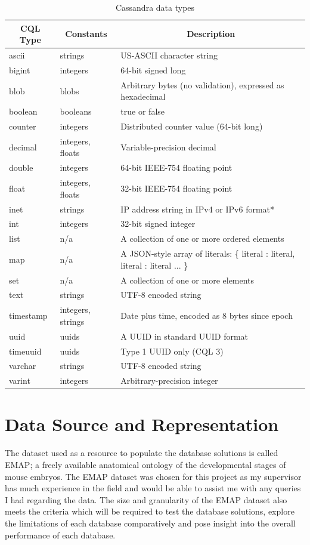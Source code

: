 \begin{table}[H]
\centering
\begin{tabular}{|l|l|l|}
\hline
\multicolumn{1}{|c|}{\textbf{CQL Type}} & \multicolumn{1}{c|}{\textbf{Constants}} & \multicolumn{1}{c|}{\textbf{Description}} \\ \hline
ascii & strings & US-ASCII character string \\ \hline
bigint & integers & 64-bit signed long \\ \hline
blob & blobs & Arbitrary bytes (no validation), expressed as hexadecimal \\ \hline
boolean & booleans & true or false \\ \hline
counter & integers & Distributed counter value (64-bit long) \\ \hline
decimal & integers, floats & Variable-precision decimal \\ \hline
double & integers & 64-bit IEEE-754 floating point \\ \hline
float & integers, floats & 32-bit IEEE-754 floating point \\ \hline
inet & strings & IP address string in IPv4 or IPv6 format* \\ \hline
int & integers & 32-bit signed integer \\ \hline
list & n/a & A collection of one or more ordered elements \\ \hline
map & n/a & A JSON-style array of literals: \{ literal : literal, literal : literal ... \} \\ \hline
set & n/a & A collection of one or more elements \\ \hline
text & strings & UTF-8 encoded string \\ \hline
timestamp & integers, strings & Date plus time, encoded as 8 bytes since epoch \\ \hline
uuid & uuids & A UUID in standard UUID format \\ \hline
timeuuid & uuids & Type 1 UUID only (CQL 3) \\ \hline
varchar & strings & UTF-8 encoded string \\ \hline
varint & integers & Arbitrary-precision integer \\ \hline
\end{tabular}
\caption{Cassandra data types}
\label{tab:cassdt}
\end{table}

\section{Data Source and Representation}\label{datasource}
The dataset used as a resource to populate the database solutions is called EMAP; a freely available anatomical ontology of the developmental stages of mouse embryos. The EMAP dataset was chosen for this project as my supervisor has much experience in the field and would be able to assist me with any queries I had regarding the data. The size and granularity of the EMAP dataset also meets the criteria which will be required to test the database solutions, explore the limitations of each database comparatively and pose insight into the overall performance of each database.

